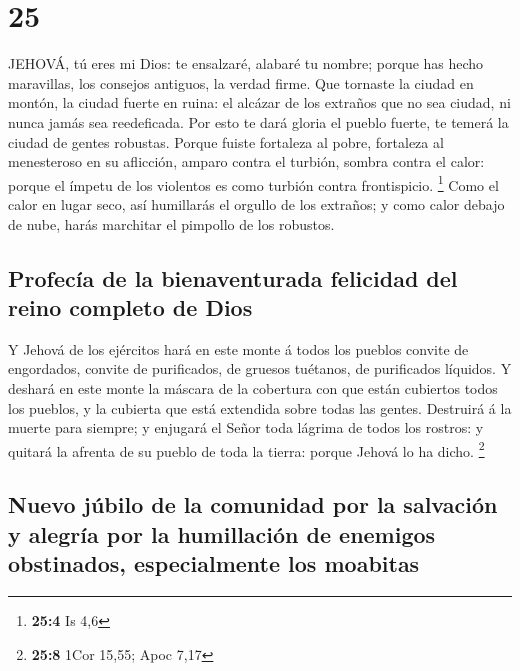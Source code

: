 \hypertarget{section-24}{%
\section{25}\label{section-24}}

 JEHOVÁ, tú eres mi Dios: te ensalzaré, alabaré tu nombre;
porque has hecho maravillas, los consejos antiguos, la verdad firme.
 Que tornaste la ciudad en montón, la ciudad fuerte en
ruina: el alcázar de los extraños que no sea ciudad, ni nunca jamás sea
reedeficada.  Por esto te dará gloria el pueblo fuerte, te
temerá la ciudad de gentes robustas.  Porque fuiste
fortaleza al pobre, fortaleza al menesteroso en su aflicción, amparo
contra el turbión, sombra contra el calor: porque el ímpetu de los
violentos es como turbión contra frontispicio. \footnote{\textbf{25:4}
  Is 4,6}  Como el calor en lugar seco, así humillarás el
orgullo de los extraños; y como calor debajo de nube, harás marchitar el
pimpollo de los robustos.

\hypertarget{profecuxeda-de-la-bienaventurada-felicidad-del-reino-completo-de-dios}{%
\subsection{Profecía de la bienaventurada felicidad del reino completo
de
Dios}\label{profecuxeda-de-la-bienaventurada-felicidad-del-reino-completo-de-dios}}

 Y Jehová de los ejércitos hará en este monte á todos los
pueblos convite de engordados, convite de purificados, de gruesos
tuétanos, de purificados líquidos.  Y deshará en este monte
la máscara de la cobertura con que están cubiertos todos los pueblos, y
la cubierta que está extendida sobre todas las gentes. 
Destruirá á la muerte para siempre; y enjugará el Señor toda lágrima de
todos los rostros: y quitará la afrenta de su pueblo de toda la tierra:
porque Jehová lo ha dicho. \footnote{\textbf{25:8} 1Cor 15,55; Apoc 7,17}

\hypertarget{nuevo-juxfabilo-de-la-comunidad-por-la-salvaciuxf3n-y-alegruxeda-por-la-humillaciuxf3n-de-enemigos-obstinados-especialmente-los-moabitas}{%
\subsection{Nuevo júbilo de la comunidad por la salvación y alegría por
la humillación de enemigos obstinados, especialmente los
moabitas}\label{nuevo-juxfabilo-de-la-comunidad-por-la-salvaciuxf3n-y-alegruxeda-por-la-humillaciuxf3n-de-enemigos-obstinados-especialmente-los-moabitas}}

